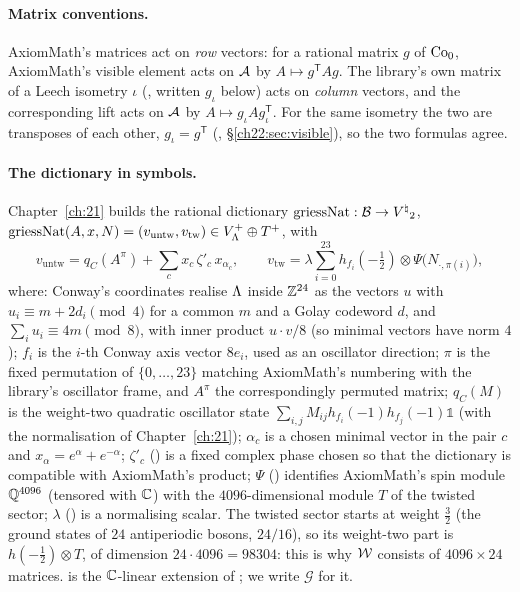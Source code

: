 \paragraph{Matrix conventions.}  AxiomMath's matrices act on \emph{row} vectors: for a rational matrix $g$ of
$\mathrm{Co}_0$, AxiomMath's visible element acts on $\mathcal{A}$ by $A\mapsto g^{\mathsf T}Ag$.  The library's own
matrix of a Leech isometry $\iota$ (, written $g_\iota$ below) acts on \emph{column} vectors, and
the corresponding lift acts on $\mathcal{A}$ by $A\mapsto g_\iota Ag_\iota^{\mathsf T}$.  For the same isometry the two
are transposes of each other, $g_\iota=g^{\mathsf T}$ (, \S\ref{ch22:sec:visible}), so the two
formulas agree.

\paragraph{The dictionary in symbols.}  Chapter~\ref{ch:21} builds the rational dictionary
$\mathrm{griessNat}:\mathcal{B}\to{V^{\natural}}_2$, $\mathrm{griessNat}(A,x,N)=(v_{\mathrm{untw}},v_{\mathrm{tw}})\in
V_{\Lambda}^+\oplus T^+$, with
\begin{equation*}
  v_{\mathrm{untw}}=q_C(A^\pi)+\sum_{c}x_c\,\zeta'_c\,x_{\alpha_c},\qquad
  v_{\mathrm{tw}}=\lambda\sum_{i=0}^{23}h_{f_i}(-\tfrac12)\otimes\Psi\bigl(N_{\cdot,\pi(i)}\bigr),
\end{equation*}
where: Conway's coordinates realise ${\Lambda}$ inside ${\mathbb{Z}}^{24}$ as the vectors $u$ with $u_i\equiv m+2d_i\pmod4$ for a
common $m$ and a Golay codeword $d$, and $\sum_iu_i\equiv4m\pmod8$, with inner product $u\cdot v/8$ (so minimal vectors
have norm $4$); $f_i$ is the $i$-th Conway axis vector $8e_i$, used as an oscillator direction; $\pi$ is the fixed
permutation of $\{0,\dots,23\}$ matching AxiomMath's numbering with the library's oscillator frame, and $A^\pi$ the
correspondingly permuted matrix; $q_C(M)$ is the weight-two quadratic oscillator state
$\sum_{i,j}M_{ij}h_{f_i}(-1)h_{f_j}(-1)\mathbb 1$ (with the normalisation of Chapter~\ref{ch:21}); $\alpha_c$ is a chosen
minimal vector in the pair $c$ and $x_\alpha=e^\alpha+e^{-\alpha}$; $\zeta'_c$ () is a fixed complex
phase chosen so that the dictionary is compatible with AxiomMath's product; $\Psi$ () identifies AxiomMath's
spin module ${\mathbb{Q}}^{4096}$ (tensored with ${\mathbb{C}}$) with the $4096$-dimensional module $T$ of the twisted sector; $\lambda$
() is a normalising scalar.  The twisted sector starts at weight $\tfrac32$ (the ground states of
$24$ antiperiodic bosons, $24/16$), so its weight-two part is $h(-\tfrac12)\otimes T$, of dimension $24\cdot4096=98304$:
this is why $\mathcal{W}$ consists of $4096\times24$ matrices.   is the ${\mathbb{C}}$-linear extension of
; we write $\mathcal G$ for it.

